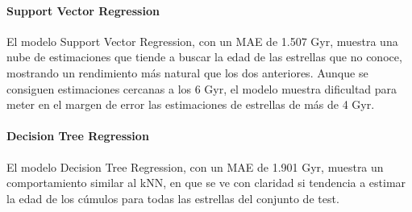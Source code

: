 \paragraph{Support Vector Regression} 
El modelo Support Vector Regression, con un MAE de 1.507 Gyr, muestra una nube de estimaciones que tiende a buscar la edad de las estrellas que no conoce, mostrando un rendimiento más natural que los dos anteriores. Aunque se consiguen estimaciones cercanas a los 6 Gyr, el modelo muestra dificultad para meter en el margen de error las estimaciones de estrellas de más de 4 Gyr. %


\paragraph{Decision Tree Regression} 
El modelo Decision Tree Regression, con un MAE de 1.901 Gyr, muestra un comportamiento similar al kNN, en que se ve con claridad si tendencia a estimar la edad de los cúmulos para todas las estrellas del conjunto de test. %

